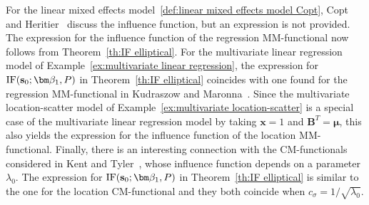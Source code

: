 \documentclass{article}
\numberwithin{equation}{section}
\theoremstyle{plain}
\newcommand{\bbeta}{\bm\beta}
\newcommand{\bmu}{\bm\mu}
\newcommand{\bx}{\mathbf{x}}
\newcommand{\bs}{\mathbf{s}}
\newcommand{\bB}{\mathbf{B}}
\begin{document}
For the linear mixed effects model~\eqref{def:linear mixed effects model Copt},
Copt and Heritier~\cite{copt&heritier2007} discuss the influence function, but an expression is not provided.
The expression for the influence function of the regression MM-functional now follows from 
Theorem~\ref{th:IF elliptical}.
For the multivariate linear regression model of Example~\ref{ex:multivariate linear regression}, 
the expression for $\text{\rm IF}(\bs_0;\bbeta_1,P)$ in Theorem~\ref{th:IF elliptical}
coincides with one found for the regression MM-functional in Kudraszow and Maronna~\cite{kudraszow-maronna2011}.
Since the multivariate location-scatter model of Example~\ref{ex:multivariate location-scatter} 
is a special case of the multivariate linear regression model
by taking $\bx=1$ and $\bB^T=\bmu$, 
this also yields the expression for the influence function of the location MM-functional.
Finally, there is an interesting connection with the CM-functionals considered in Kent and Tyler~\cite{kent&tyler1996},
whose influence function depends on a parameter $\lambda_0$. 
The expression for $\text{\rm IF}(\bs_0;\bbeta_1,P)$ in Theorem~\ref{th:IF elliptical} is similar
to the one for the location CM-functional and they both coincide when $c_\sigma=1/\sqrt{\lambda_0}$.
\end{document}
